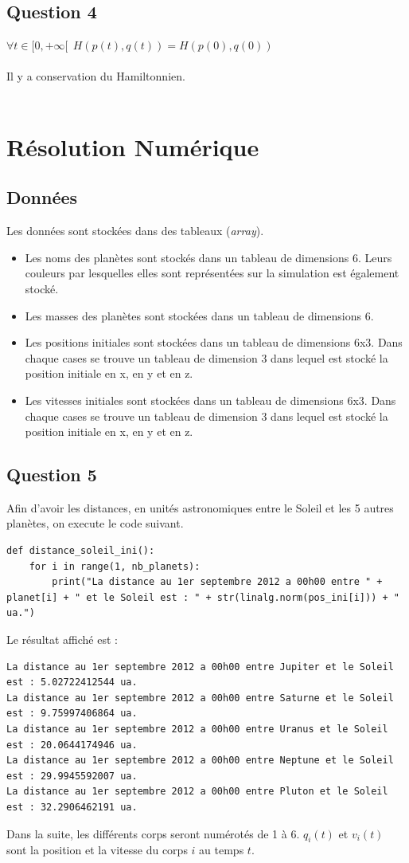 \documentclass{article}
\begin{document}
\subsection{Question 4}
$\forall t \in [0,+\infty[ ~~ H(p(t),q(t))=H(p(0),q(0))$\\ \\
Il y a conservation du Hamiltonnien.\\
\\
\section{Résolution Numérique}
\subsection*{Données}
Les données sont stockées dans des tableaux (\textit{array}).
\begin{itemize}
\item Les noms des planètes sont stockés dans un tableau de dimensions 6. Leurs couleurs par lesquelles elles sont représentées sur la simulation est également stocké.
\item Les masses des planètes sont stockées dans un tableau de dimensions 6.
\item Les positions initiales sont stockées dans un tableau de dimensions 6x3. Dans chaque cases se trouve un tableau de dimension 3 dans lequel est stocké la position initiale en x, en y et en z.
\item Les vitesses initiales sont stockées dans un tableau de dimensions 6x3. Dans chaque cases se trouve un tableau de dimension 3 dans lequel est stocké la position initiale en x, en y et en z.
\end{itemize}
\subsection*{Question 5}
Afin d'avoir les distances, en unités astronomiques entre le Soleil et les 5 autres planètes, on execute le code suivant.
\begin{lstlisting}
def distance_soleil_ini():
    for i in range(1, nb_planets):
        print("La distance au 1er septembre 2012 a 00h00 entre " + planet[i] + " et le Soleil est : " + str(linalg.norm(pos_ini[i])) + " ua.")
\end{lstlisting}
Le résultat affiché est :
\begin{lstlisting}
La distance au 1er septembre 2012 a 00h00 entre Jupiter et le Soleil est : 5.02722412544 ua.
La distance au 1er septembre 2012 a 00h00 entre Saturne et le Soleil est : 9.75997406864 ua.
La distance au 1er septembre 2012 a 00h00 entre Uranus et le Soleil est : 20.0644174946 ua.
La distance au 1er septembre 2012 a 00h00 entre Neptune et le Soleil est : 29.9945592007 ua.
La distance au 1er septembre 2012 a 00h00 entre Pluton et le Soleil est : 32.2906462191 ua.
\end{lstlisting}
Dans la suite, les différents corps seront numérotés de 1 à 6. $q_i(t)$ et $v_i(t)$ sont la position et la vitesse du corps $i$ au temps $t$.
\end{document}
